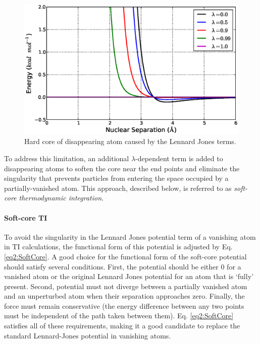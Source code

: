 \begin{figure}
   \includegraphics[width=6.5in]{HardCore.ps}
   \caption{Hard core of disappearing atom caused by the Lennard Jones terms.}
   \label{fig2:HardCore}
\end{figure}

To address this limitation, an additional $\lambda$-dependent term is added to
disappearing atoms to soften the core near the end points and eliminate the
singularity that prevents particles from entering the space occupied by a
partially-vanished atom. This approach, described below, is referred to as
\emph{soft-core thermodynamic integration}.

\paragraph{Soft-core TI}

To avoid the singularity in the Lennard Jones potential term of a vanishing atom
in TI calculations, the functional form of this potential is adjusted by Eq.
\ref{eq2:SoftCore}. A good choice for the functional form of the soft-core
potential should satisfy several conditions. First, the potential should be
either 0 for a vanished atom or the original Lennard Jones potential for an atom
that is `fully' present. Second, potential must not diverge between a partially
vanished atom and an unperturbed atom when their separation approaches zero.
Finally, the force must remain conservative (\ie the energy difference between
any two points must be independent of the path taken between them). Eq.
\ref{eq2:SoftCore} satisfies all of these requirements, making it a good
candidate to replace the standard Lennard-Jones potential in vanishing atoms.

